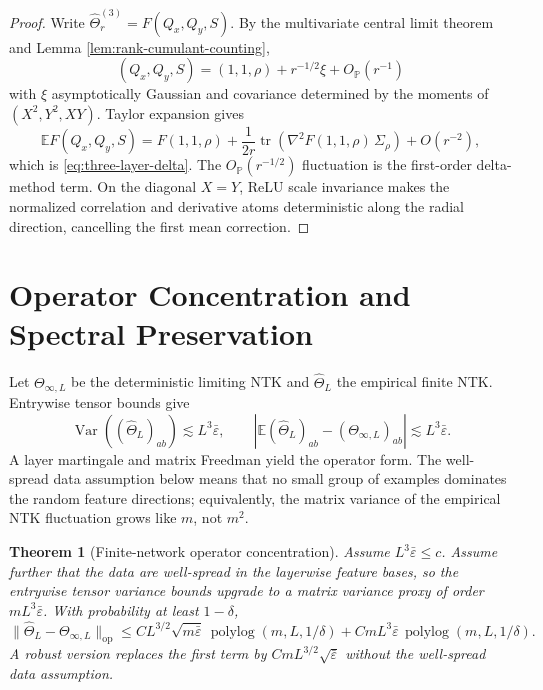\documentclass{article}
\newtheorem{theorem}{Theorem}[section]
\newcommand{\E}{\mathbb E}
\newcommand{\Pp}{\mathbb P}
\newcommand{\Var}{\operatorname{Var}}
\newcommand{\tr}{\operatorname{tr}}
\newcommand{\op}{\mathrm{op}}
\newcommand{\wh}{\widehat}
\newcommand{\barE}{\bar\varepsilon}
\begin{document}
\begin{proof}
Write \(\wh\Theta^{(3)}_r=F(Q_x,Q_y,S)\). By the multivariate central limit theorem and Lemma \ref{lem:rank-cumulant-counting},
\[
(Q_x,Q_y,S)=(1,1,\rho)+r^{-1/2}\xi+O_{\Pp}(r^{-1})
\]
with \(\xi\) asymptotically Gaussian and covariance determined by the moments of \((X^2,Y^2,XY)\). Taylor expansion gives
\[
\E F(Q_x,Q_y,S)
=F(1,1,\rho)+\frac1{2r}\tr\left(\nabla^2F(1,1,\rho)\,\Sigma_\rho\right)+O(r^{-2}),
\]
which is \eqref{eq:three-layer-delta}. The \(O_{\Pp}(r^{-1/2})\) fluctuation is the first-order delta-method term. On the diagonal \(X=Y\), ReLU scale invariance makes the normalized correlation and derivative atoms deterministic along the radial direction, cancelling the first mean correction.
\end{proof}

\section{Operator Concentration and Spectral Preservation}
Let \(\Theta_{\infty,L}\) be the deterministic limiting NTK and \(\wh\Theta_L\) the empirical finite NTK. Entrywise tensor bounds give
\begin{equation}
\Var((\wh\Theta_L)_{ab})\lesssim L^3\barE,
\qquad
|\E(\wh\Theta_L)_{ab}-(\Theta_{\infty,L})_{ab}|\lesssim L^3\barE.
\end{equation}
A layer martingale and matrix Freedman yield the operator form. The well-spread data assumption below means that no small group of examples dominates the random feature directions; equivalently, the matrix variance of the empirical NTK fluctuation grows like \(m\), not \(m^2\).

\begin{theorem}[Finite-network operator concentration]
\label{thm:operator}
Assume \(L^3\barE\le c\). Assume further that the data are well-spread in the layerwise feature bases, so the entrywise tensor variance bounds upgrade to a matrix variance proxy of order \(mL^3\barE\). With probability at least \(1-\delta\),
\begin{equation}
\|\wh\Theta_L-\Theta_{\infty,L}\|_{\op}
\le
C L^{3/2}\sqrt{m\barE}\,\operatorname{polylog}(m,L,1/\delta)
+C mL^3\barE\,\operatorname{polylog}(m,L,1/\delta).
\label{eq:operator-bound}
\end{equation}
A robust version replaces the first term by \(C mL^{3/2}\sqrt{\barE}\) without the well-spread data assumption.
\end{theorem}
\end{document}
